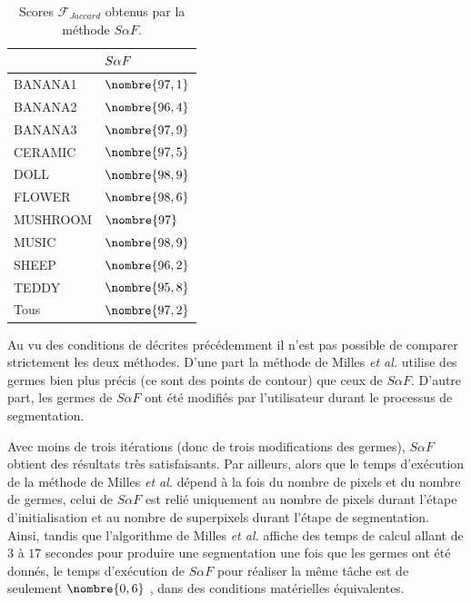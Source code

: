 \begin{table}[htb]
\caption{Scores  $\mathcal{F}_{Jaccard}$ obtenus par la méthode $S \alpha F$.}
\centering
\begin{tabular}{| l |l |}
\hline
\cellcolor{gris}{Nom de l'image} & $\cellcolor{gris}{S \alpha F }$ \\
\hline
BANANA1 & $\nombre{97,1}$\\ 
\hline
BANANA2   & $\nombre{96,4}$\\
\hline
BANANA3 &  $\nombre{97,9}$\\
\hline
CERAMIC   &  $\nombre{97,5}$\\
\hline
DOLL  & $\nombre{98,9}$\\
\hline
FLOWER  & $\nombre{98,6}$\\
\hline
MUSHROOM  &$\nombre{97}$\\
\hline
MUSIC & $\nombre{98,9}$\\
\hline
SHEEP   & $\nombre{96,2}$\\
\hline
TEDDY  & $\nombre{95,8}$\\
\hline
Tous  & $\nombre{97,2}$\\
\hline
\end{tabular}
\label{tab:eval:safMilles}
\end{table}


Au vu des conditions de  décrites précédemment\modif{,} il n'est pas possible de comparer strictement les deux méthodes. D'une part la méthode de Milles \textit{et al.} utilise des germes bien plus précis (ce sont des points de contour) que ceux de $S \alpha F$. D'autre part, les germes de $S \alpha F$ ont été modifiés par l'utilisateur durant le processus de segmentation. 

Avec moins de trois itérations (donc de trois modifications des germes),  $S \alpha F$ obtient des résultats très satisfaisants. Par ailleurs, alors que le temps d'exécution de la méthode de Milles \textit{et al.} dépend à la fois du nombre de pixels et du nombre de germes, celui de $S \alpha F$ est relié uniquement au nombre de pixels durant l'étape d'initialisation et au nombre de superpixels durant l'étape de segmentation. Ainsi, tandis que l'algorithme de Milles \textit{et al.} affiche des temps de calcul allant de $3$ à $17$ secondes pour produire une segmentation une fois que les germes ont été donnés, le temps d'exécution de $S \alpha F$ pour réaliser la même tâche est de seulement $\nombre{0,6}$ , dans des conditions matérielles équivalentes.


